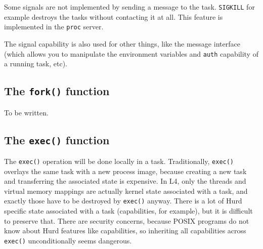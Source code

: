 \begin{comment}
  The \texttt{proc} server can not hold the signal capability itself,
  as it used to do in the implementation on Mach, as it does not trust
  the tasks implementing the capability.  But this is not a problem,
  as the sender and receiver of a signal can negotiate and bootstrap
  the connection without any further support by the \texttt{proc}
  server.
  
  Also, the \texttt{proc} server can not even hold task info caps to
  support the sender of a signal in bootstrapping the connection.
  This means that there is a race between looking up the signal thread
  ID from the PID in the \texttt{proc} server and acquiring a task
  info cap for the task ID of the signal receiver in the sender.
  However, in Unix, there is always a race when sending a signal using
  \verb/kill/.  The task server helps the users a bit here by not
  reusing task IDs as long as possible.
\end{comment}

Some signals are not implemented by sending a message to the task.
\verb/SIGKILL/ for example destroys the tasks without contacting it at
all.  This feature is implemented in the \texttt{proc} server.

The signal capability is also used for other things, like the message
interface (which allows you to manipulate the environment variables
and \texttt{auth} capability of a running task, etc).


\subsection{The \texttt{fork()} function}

To be written.


\subsection{The \texttt{exec()} function}
\label{exec}

The \texttt{exec()} operation will be done locally in a task.
Traditionally, \texttt{exec()} overlays the same task with a new
process image, because creating a new task and transferring the
associated state is expensive.  In L4, only the threads and virtual
memory mappings are actually kernel state associated with a task, and
exactly those have to be destroyed by \texttt{exec()} anyway.  There
is a lot of Hurd specific state associated with a task (capabilities,
for example), but it is difficult to preserve that.  There are
security concerns, because POSIX programs do not know about Hurd
features like capabilities, so inheriting all capabilities across
\texttt{exec()} unconditionally seems dangerous.

